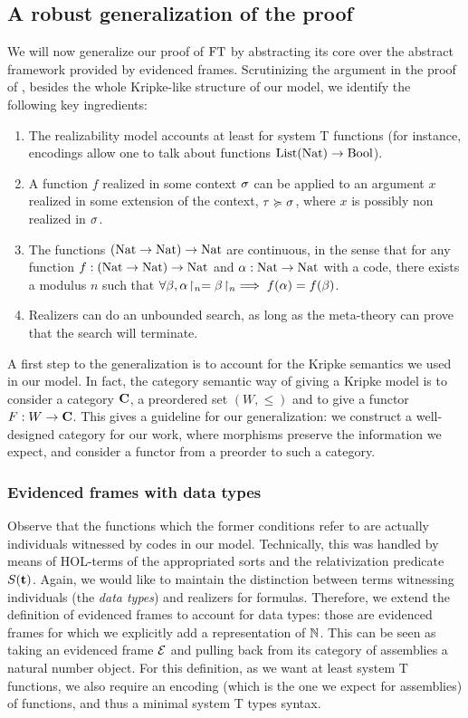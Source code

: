 \documentclass[a4paper,UKenglish,cleveref, autoref, thm-restate]{lipics-v2021}
\begin{document}
\subsection{A robust generalization of the proof}
\label{s:generalization}


We will now generalize our proof of $\mathrm{FT}$ by abstracting its core over the
abstract framework provided by evidenced frames.
Scrutinizing the argument in the proof of ,
besides the whole Kripke-like structure of our model,
we identify the following key ingredients:
\begin{enumerate}
\item The realizability model accounts at least for system T functions (for instance,
encodings allow one to talk about functions $\mathrm{List}(\mathrm{Nat}) \to \mathrm{Bool}$).
\item A function $f$ realized in some context $\sigma$ can be applied to an argument $x$ realized in some extension of the context, $\tau \succcurlyeq \sigma$, where $x$ is possibly non realized in $\sigma$.
\item The functions $(\mathrm{Nat} \to \mathrm{Nat}) \to \mathrm{Nat}$ are continuous, in the sense that for any function $f : (\mathrm{Nat} \to \mathrm{Nat}) \to \mathrm{Nat}$ and $\alpha : \mathrm{Nat} \to \mathrm{Nat}$ with a code, there exists a modulus $n$ such that $\forall \beta, {\alpha}\!\upharpoonright_{n} = {\beta}\!\upharpoonright_{n} \implies f(\alpha) = f(\beta)$.
\item Realizers can do an unbounded search,
as long as the meta-theory can prove that the search will terminate.
\end{enumerate}



A first step to the generalization is to account for the Kripke semantics we used in our model.
In fact, the category semantic way of giving a Kripke model is to consider a category $\mathbf{C}$,
a preordered set $(W, \leq)$ and to give a functor $F : W \to \mathbf{C}$.
This gives a guideline for our generalization: we construct a well-designed category for our work,
where morphisms preserve the information we expect, and consider a functor from a preorder to such a category.


\subsubsection{Evidenced frames with data types}
Observe that the functions which the former conditions refer to
are actually individuals witnessed by codes in our model.
Technically, this was handled by means of HOL-terms of the appropriated sorts
and the relativization predicate $S(\mathbf{t})$.
Again, we would like to maintain the distinction between terms witnessing individuals (the \emph{data types})
and realizers for formulas.
Therefore, we extend the definition of evidenced frames to account for data types:
those are evidenced frames for which we explicitly add a representation of $\mathbb N$.
This can be seen as taking an evidenced frame $\mathcal{E}$
and pulling back from its category of assemblies a natural number object.
For this definition, as we want at least system T functions,
we also require an encoding (which is the one we expect for assemblies)
of functions, and thus a minimal system T types syntax.
\end{document}
